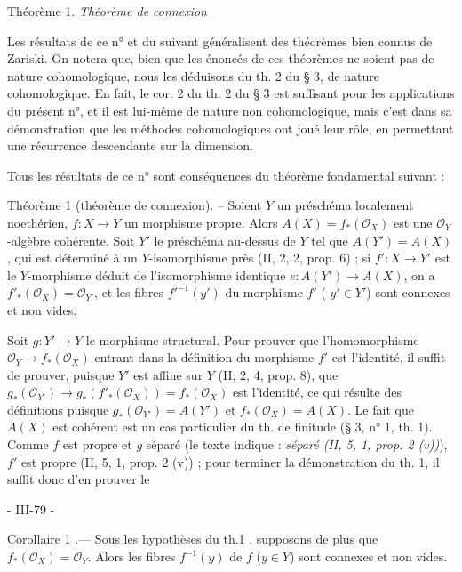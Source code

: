 \noindent Théorème 1. \emph{Théorème de connexion}

Les résultats de ce n° et du suivant généralisent des théorèmes bien connus de Zariski. On notera que, bien que les énoncés de ces théorèmes ne soient pas de nature cohomologique, nous les déduisons du th. 2 du § 3, de nature cohomologique. En fait, le cor. 2 du th. 2 du § 3 est suffisant pour les applications du présent n°, et il est lui-même de nature non cohomologique, mais c'est dans sa démonstration que les méthodes cohomologiques ont joué leur rôle, en permettant une récurrence descendante sur la dimension.

Tous les résultats de ce n° sont conséquences du théorème fondamental suivant :

\noindent Théorème 1 (théorème de connexion). -- Soient $Y$ un préschéma localement noethérien, $f : X \to Y$ un morphisme propre. Alors $A(X) = f_*(\mathcal{O}_X)$ est une $\mathcal{O}_Y$-algèbre cohérente. Soit $Y'$ le préschéma au-dessus de $Y$ tel que $A(Y') = A(X)$, qui est déterminé à un $Y$-isomorphisme près (II, 2, 2, prop. 6) ; si $f' : X \to Y'$ est le $Y$-morphisme déduit de l'isomorphisme identique $e : A(Y') \to A(X)$, on a $f'_*(\mathcal{O}_X) = \mathcal{O}_{Y'}$, et les fibres $f'^{-1}(y')$ du morphisme $f'$ ( $y' \in Y'$) sont connexes et non vides.

Soit $g : Y' \to Y$ le morphisme structural. Pour prouver que l'homomorphisme $\mathcal{O}_Y \to f_*(\mathcal{O}_X)$ entrant dans la définition du morphisme $f'$ est l'identité, il suffit de prouver, puisque $Y'$ est affine sur $Y$ (II, 2, 4, prop. 8), que $g_*(\mathcal{O}_{Y'}) \to g_*(f'_*(\mathcal{O}_X)) = f_*(\mathcal{O}_X)$ est l'identité, ce qui résulte des définitions puisque $g_*(\mathcal{O}_{Y'}) = A(Y')$ et $f_*(\mathcal{O}_X) = A(X)$.
Le fait que $A(X)$ est cohérent est un cas particulier du th. de finitude (§ 3, n° 1, th. 1). Comme $f$ est propre et $g$ séparé (le texte indique : \textit{séparé (II, 5, 1, prop. 2 (v))}), $f'$ est propre (II, 5, 1, prop. 2 (v)) ; pour terminer la démonstration du th. 1, il suffit donc d'en prouver le 

\newpage


- III-79 -

Corollaire 1 .— Sous les hypothèses du th.1 , supposons de plus que
$f_*(\mathcal{O}_X) = \mathcal{O}_Y$. Alors les fibres $f^{-1}(y)$ de $f$ ($y \in Y$) sont connexes et non
vides.

